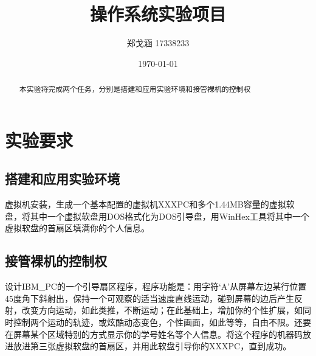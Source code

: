 \documentclass[UTF8]{ctexart}
\title{操作系统实验项目}
\author{郑戈涵 17338233}
\date{\today}
\begin{document}
\maketitle
\begin{abstract}
	本实验将完成两个任务，分别是搭建和应用实验环境和接管裸机的控制权
\end{abstract}
\tableofcontents
\section{实验要求}
\subsection{搭建和应用实验环境}
	虚拟机安装，生成一个基本配置的虚拟机XXXPC和多个1.44MB容量的虚拟软盘，将其中一个虚拟软盘用DOS格式化为DOS引导盘，用WinHex工具将其中一个虚拟软盘的首扇区填满你的个人信息。

\subsection{接管裸机的控制权}
	设计IBM_PC的一个引导扇区程序，程序功能是：用字符‘A’从屏幕左边某行位置45度角下斜射出，保持一个可观察的适当速度直线运动，碰到屏幕的边后产生反射，改变方向运动，如此类推，不断运动；在此基础上，增加你的个性扩展，如同时控制两个运动的轨迹，或炫酷动态变色，个性画面，如此等等，自由不限。还要在屏幕某个区域特别的方式显示你的学号姓名等个人信息。将这个程序的机器码放进放进第三张虚拟软盘的首扇区，并用此软盘引导你的XXXPC，直到成功。\par
\end{document}
